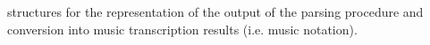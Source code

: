 structures for the representation of the output of the parsing procedure and conversion into music transcription results (i.\+e. music notation). 